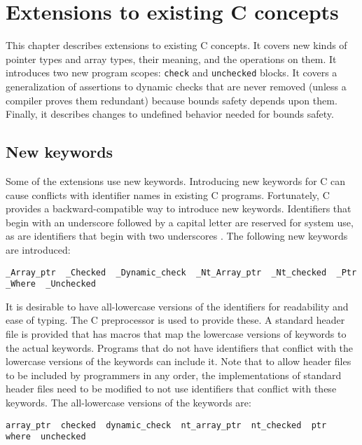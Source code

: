 
\chapter{Extensions to existing C concepts}
\label{chapter:core-extensions}

This chapter describes extensions to existing C concepts. 
It covers new kinds of pointer types and array types, their meaning,
and the operations  on them.   It introduces two
new program scopes: \texttt{check} and \texttt{unchecked}
blocks. It covers a generalization of assertions to 
dynamic checks that are never  removed (unless a compiler
proves them redundant) because bounds safety depends upon them. 
Finally, it describes changes to
undefined behavior needed for bounds safety.

\section{New keywords}
Some of the extensions use new keywords.   Introducing new keywords
for C can cause conflicts with identifier names in existing C programs.
Fortunately, C provides a backward-compatible way to introduce new
keywords.  Identifiers that begin with an underscore followed by a
capital letter are reserved for system use, as are identifiers that
begin with two underscores \cite[Section 7.1.3]{ISO2011}. The following
new keywords are introduced:
\begin{verbatim}
_Array_ptr  _Checked  _Dynamic_check  _Nt_Array_ptr  _Nt_checked  _Ptr
_Where  _Unchecked
\end{verbatim}

It is desirable to have all-lowercase versions of the
identifiers for readability and ease of typing. The C
preprocessor is used to provide these. A standard header
file  is provided that has macros
that map the lowercase versions of keywords to the actual keywords.
Programs that do not have identifiers that conflict with the
lowercase versions of the keywords can include it.
Note that to allow header files to be included by programmers in any order,
the implementations of standard header files need to be modified to
not use identifiers that conflict with these keywords.
The all-lowercase versions of the keywords are:
\begin{verbatim}
array_ptr  checked  dynamic_check  nt_array_ptr  nt_checked  ptr
where  unchecked
\end{verbatim}

